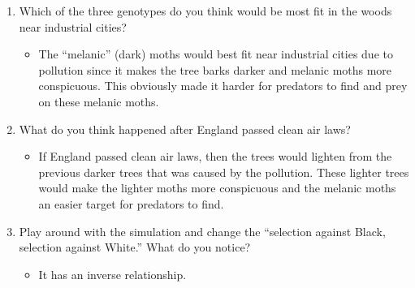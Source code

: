 \documentclass{article}
\begin{document}
\begin{enumerate}
\begin{itemize}
  \end{itemize}
  \item Which of the three genotypes do you think would be most fit in the woods near industrial cities?
  \begin{itemize}
    \item The ``melanic'' (dark) moths would best fit near industrial cities due to pollution since it makes the tree barks darker and melanic moths more conspicuous. This obviously made it harder for predators to find and prey on these melanic moths.
  \end{itemize}
  \item What do you think happened after England passed clean air laws?
  \begin{itemize}
    \item If England passed clean air laws, then the trees would lighten from the previous darker trees that was caused by the pollution. These lighter trees would make the lighter moths more conspicuous and the melanic moths an easier target for predators to find.
  \end{itemize}
  \item Play around with the simulation and change the ``selection against Black, selection against White.'' What do you notice?
  \begin{itemize}
    \item It has an inverse relationship.
  \end{itemize}
\end{enumerate}
\end{document}
